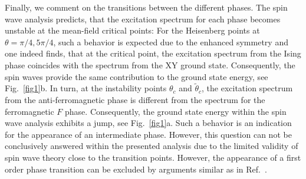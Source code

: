 Finally, we comment on the transitions between the different phases. The spin wave analysis predicts,
that the excitation spectrum for each phase becomes unstable at the mean-field critical points: For the Heisenberg
points at $\theta = \pi/4, 5\pi/4$, such a behavior is expected due to the enhanced symmetry and one indeed finds,
that at the critical point, the excitation spectrum from the Ising phase coincides with the spectrum from the XY ground state.
Consequently, the spin waves provide the same  contribution to the ground state energy, see Fig.~\ref{fig1}b. In turn, at the instability points
$\theta_{c}$ and $\tilde{\theta}_{c}$, the excitation spectrum from the anti-ferromagnetic phase is different from the spectrum for the ferromagnetic $F$ phase.
Consequently, the ground state energy within the spin wave analysis exhibits a jump, see Fig.~\ref{fig1}a. Such a behavior is an indication
for the appearance of an intermediate phase. However,  this question can not be conclusively answered within the presented analysis due to  the limited validity of spin wave theory close to the transition points. However, the appearance of a first order phase transition can be excluded by arguments similar as in
Ref.~\cite{spivak04}.
